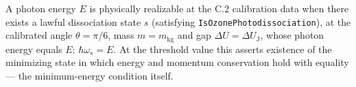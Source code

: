 \begin{definition}
\label{def:IPhO2026Problems_problem_IPhO_2026_1_C_2:ThresholdRealizable}
A photon energy $E$ is physically realizable at the C.2 calibration data
when there exists a lawful dissociation state $s$ (satisfying
\texttt{IsOzonePhotodissociation}), at the calibrated angle $\theta = \pi/6$,
mass $m = m_{\mathrm{kg}}$ and gap $\Delta U = \Delta U_{\mathrm{J}}$, whose
photon energy equals $E$: $\hbar\omega_s = E$.  At the threshold value this
asserts existence of the minimizing state in which energy and momentum
conservation hold with equality --- the minimum-energy condition itself.
\end{definition}

